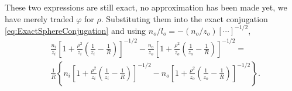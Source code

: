                 These two expressions are still exact, no approximation has been made yet, we have merely traded $\varphi$ for $\rho$. Substituting them into the exact conjugation \ref{eq:ExactSphereConjugation} and using $n_o/l_o = -\left(n_o/z_o\right)\left[\cdots\right]^{-1/2}$,
                \begin{align}
                    & \frac{n_i}{z_i}\left[ 1+\frac{\rho^2}{z_i}\left( \frac{1}{z_i}-\frac{1}{R} \right) \right]^{-1/2} - \frac{n_o}{z_o}\left[ 1+\frac{\rho^2}{z_o}\left( \frac{1}{z_o}-\frac{1}{R} \right) \right]^{-1/2} = \nonumber\\
                    & \frac{1}{R}\left\{ n_i\left[ 1+\frac{\rho^2}{z_i}\left( \frac{1}{z_i}-\frac{1}{R} \right) \right]^{-1/2} - n_o\left[ 1+\frac{\rho^2}{z_o}\left( \frac{1}{z_o}-\frac{1}{R} \right) \right]^{-1/2} \right\}.\label{eq:ExactInRho}
                \end{align}

